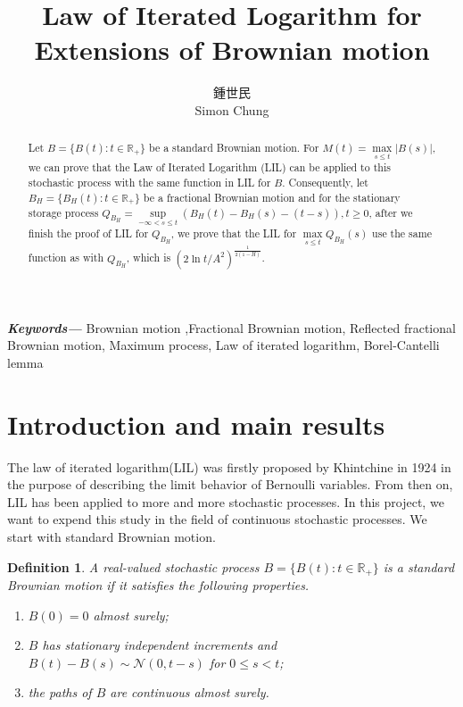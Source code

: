\documentclass{article}
\title{\Huge Law of Iterated Logarithm for Extensions of Brownian motion}
\author{\Large 鍾世民\\Simon Chung}
\date{\empty}
\newtheorem{defin}{\sc Definition}
\providecommand{\keywords}[1]
{
  \small	
  \textbf{\textit{Keywords---}} #1
}
\begin{document}
\begin{CJK*}{UTF8}{bsmi}
\maketitle
\vspace*{5.5cm}\par
\begin{abstract}
\fontsize{13pt}{12pt}   
\selectfont
\baselineskip 16pt
Let $B = \{B(t):t \in \mathbb{R_{+}} \}$ be a standard Brownian motion. For  $M(t) = \max\limits_{s\leqslant t}{|B(s)|}$, we can prove that the Law of Iterated Logarithm (LIL) can be applied to this stochastic process with the same function in LIL for $B$. Consequently, let $B_H = \{B_H(t):t \in \mathbb{R}_+ \}$ be a fractional Brownian motion and for the stationary storage process $Q_{B_{H}}=\sup \limits_{-\infty<s\leqslant t}\left(B_{H}(t)-B_{H}(s)-(t-s)\right), t \geq 0$, after we finish the proof of LIL for $Q_{B_H}$, we prove that the LIL for $\max \limits_{s\leqslant t}Q_{B_{H}}(s)$ use the same function as with $Q_{B_H}$, which is $(2\ln{t}/A^2)^{\frac{1}{2(1-H)}}$.

\end{abstract}\hspace{10pt}

\keywords{Brownian motion ,Fractional Brownian motion, Reflected fractional Brownian motion, Maximum process, Law of iterated logarithm, Borel-Cantelli lemma}

\newpage
\fontsize{13pt}{12pt}
\selectfont
\baselineskip 18pt
\section{Introduction and main results}
The law of iterated logarithm(LIL) was firstly proposed by Khintchine \citep{khintchine1924satz} in 1924 in the purpose of describing the limit behavior of Bernoulli variables. From then on, LIL has been applied to more and more stochastic processes. In this project, we want to expend this study in the field of continuous stochastic processes. We start with standard Brownian motion.

\begin{defin}
\label{bm}
	A real-valued stochastic process $B = \{B(t):t \in \mathbb{R_{+}} \}$ is a standard Brownian motion if it satisfies the following properties.
	\begin{enumerate}
        \item[(i)] $B(0)=0$ almost surely;
		\item[(ii)] $B$ has stationary independent increments and $B(t)-B(s)\sim \mathcal{N}(0, t-s)$ for $0\leq s < t$;
		\item[(iii)] the paths of $B$ are continuous almost surely.
	\end{enumerate}
\end{defin}


\end{CJK*}
\end{document}
